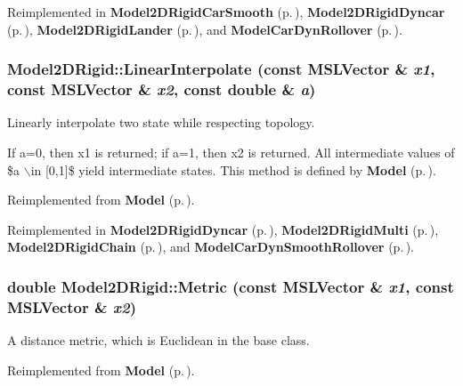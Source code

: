 Reimplemented in {\bf Model2DRigid\-Car\-Smooth} {\rm (p.\,\pageref{classModel2DRigidCarSmooth_a3})}, {\bf Model2DRigid\-Dyncar} {\rm (p.\,\pageref{classModel2DRigidDyncar_a2})}, {\bf Model2DRigid\-Lander} {\rm (p.\,\pageref{classModel2DRigidLander_a2})}, and {\bf Model\-Car\-Dyn\-Rollover} {\rm (p.\,\pageref{classModelCarDynRollover_a5})}.
\subsubsection{ Model2DRigid::Linear\-Interpolate (const {\bf MSLVector} \& {\em x1}, const {\bf MSLVector} \& {\em x2}, const double \& {\em a})\hspace{0.3cm}{\tt  [virtual]}}\label{classModel2DRigid_a4}


Linearly interpolate two state while respecting topology.

If a=0, then x1 is returned; if a=1, then x2 is returned. All intermediate values of \$a $\backslash$in [0,1]\$ yield intermediate states. This method is defined by {\bf Model} {\rm (p.\,\pageref{classModel})}. 

Reimplemented from {\bf Model} {\rm (p.\,\pageref{classModel_a6})}.

Reimplemented in {\bf Model2DRigid\-Dyncar} {\rm (p.\,\pageref{classModel2DRigidDyncar_a6})}, {\bf Model2DRigid\-Multi} {\rm (p.\,\pageref{classModel2DRigidMulti_a4})}, {\bf Model2DRigid\-Chain} {\rm (p.\,\pageref{classModel2DRigidChain_a4})}, and {\bf Model\-Car\-Dyn\-Smooth\-Rollover} {\rm (p.\,\pageref{classModelCarDynSmoothRollover_a5})}.
\subsubsection{\setlength{\rightskip}{0pt plus 5cm}double Model2DRigid::Metric (const {\bf MSLVector} \& {\em x1}, const {\bf MSLVector} \& {\em x2})\hspace{0.3cm}{\tt  [virtual]}}\label{classModel2DRigid_a5}


A distance metric, which is Euclidean in the base class.



Reimplemented from {\bf Model} {\rm (p.\,\pageref{classModel_a9})}.

